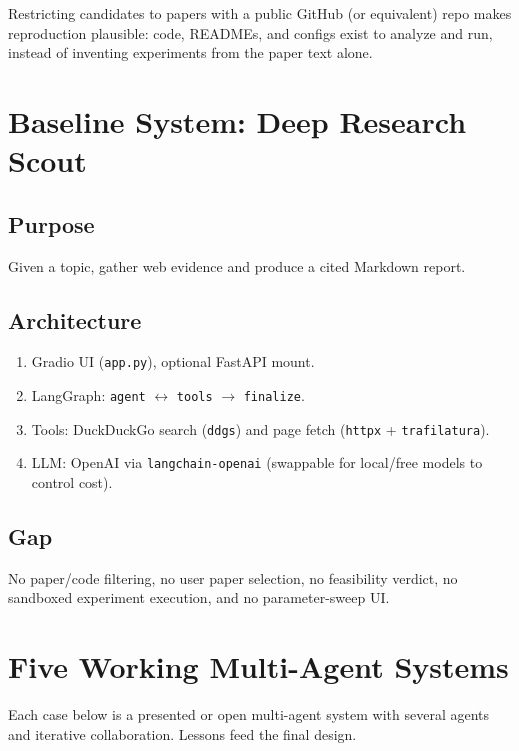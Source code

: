 \documentclass[11pt,a4paper]{article}
\begin{document}
Restricting candidates to papers with a public GitHub (or equivalent) repo
makes reproduction plausible: code, READMEs, and configs exist to analyze and
run, instead of inventing experiments from the paper text alone.

\section{Baseline System: Deep Research Scout}

\subsection{Purpose}
Given a topic, gather web evidence and produce a cited Markdown report.

\subsection{Architecture}
\begin{enumerate}[leftmargin=*]
  \item Gradio UI (\texttt{app.py}), optional FastAPI mount.
  \item LangGraph: \texttt{agent} $\leftrightarrow$ \texttt{tools}
        $\rightarrow$ \texttt{finalize}.
  \item Tools: DuckDuckGo search (\texttt{ddgs}) and page fetch
        (\texttt{httpx} + \texttt{trafilatura}).
  \item LLM: OpenAI via \texttt{langchain-openai} (swappable for local/free
        models to control cost).
\end{enumerate}

\subsection{Gap}
No paper/code filtering, no user paper selection, no feasibility verdict, no
sandboxed experiment execution, and no parameter-sweep UI.

\section{Five Working Multi-Agent Systems}

Each case below is a presented or open multi-agent system with several agents
and iterative collaboration. Lessons feed the final design.
\end{document}
